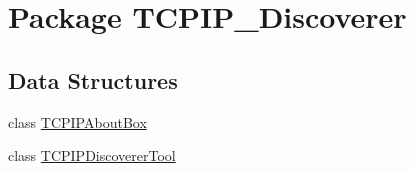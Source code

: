 \hypertarget{namespace_t_c_p_i_p___discoverer}{}\section{Package T\+C\+P\+I\+P\+\_\+\+Discoverer}
\label{namespace_t_c_p_i_p___discoverer}
\subsection*{Data Structures}
\begin{DoxyCompactItemize}
\item 
class \hyperlink{class_t_c_p_i_p___discoverer_1_1_t_c_p_i_p_about_box}{T\+C\+P\+I\+P\+About\+Box}
\item 
class \hyperlink{class_t_c_p_i_p___discoverer_1_1_t_c_p_i_p_discoverer_tool}{T\+C\+P\+I\+P\+Discoverer\+Tool}
\end{DoxyCompactItemize}

